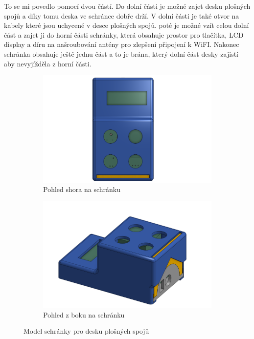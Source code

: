 To se mi povedlo pomocí dvou částí. Do dolní části je možné zajet desku plošných spojů a díky tomu deska ve schránce dobře drží. V dolní části je také otvor na kabely které jsou uchycené v desce plošných spojů. poté je možné vzít celou dolní část a zajet ji do horní části schránky, která obsahuje prostor pro tlačítka, LCD display a díru na našroubování antény pro zlepšení připojení k WiFI. Nakonec schránka obsahuje ještě jednu část a to je brána, který dolní část desky zajistí aby nevyjížděla z horní části.

\begin{figure}[H]
    \centering
    \begin{subfigure}[t]{0.48\textwidth}
        \includegraphics[width=\textwidth]{images/krabickaTop.png}
        \caption{Pohled shora na schránku}
        \label{fig:krabickaTop}
    \end{subfigure}%
    \hfill
    \begin{subfigure}[t]{0.48\textwidth}
        \includegraphics[width=\textwidth]{images/KrabickaZBoku.png}
        \caption{Pohled z boku na schránku}
        \label{fig:KrabickaZBoku}
    \end{subfigure}
    \caption{Model schránky pro desku plošných spojů}
    \label{fig:krabickaObaPohledy}
\end{figure}


